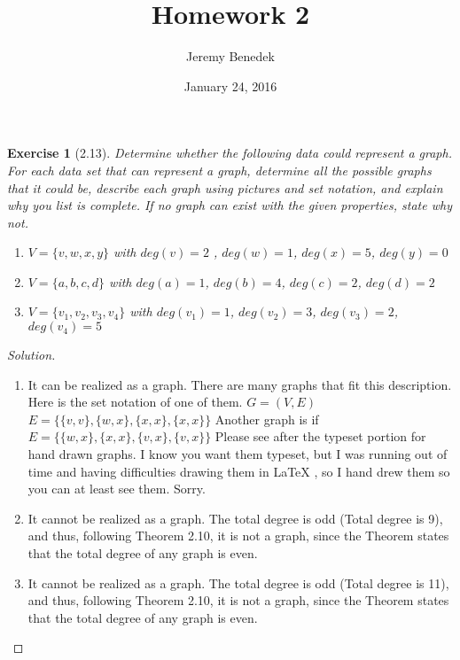 \documentclass{article}
\title{Homework 2}
\author{Jeremy Benedek}
\date{January 24, 2016}
\newtheorem*{ex}{Exercise}
\newenvironment{solution}
  {\begin{proof}[Solution]}
  {\renewcommand{\qedsymbol}{}\end{proof}}
\begin{document}
\maketitle

\begin{ex}[2.13]
	Determine whether the following data could represent a graph. For each data set that \textit{can} represent a graph, determine \textit{all} the possible graphs that it could be, describe each graph using pictures
	and set notation, and explain why you list is complete. If no graph can exist with the given properties, state why not. 
	\begin{enumerate} 
	  \item $V = \{v,w,x,y\}$ with $deg(v) = 2$ , $deg(w) = 1$, $deg(x) = 5$, $deg(y) = 0$
	  \item $V = \{a,b,c,d\}$ with $deg(a) = 1$, $deg(b) = 4$, $deg(c) = 2$, $deg(d) = 2$
          \item $V = \{v_1,v_2,v_3,v_4\}$ with $deg(v_1) = 1$, $deg(v_2) = 3$, $deg(v_3) = 2$, $deg(v_4) = 5$
       \end{enumerate}
\end{ex}
\begin{solution}
	\begin{enumerate}
	  \item It can be realized as a graph. There are many graphs that fit this description. Here is the set notation of one of them. $G=(V,E)$ $E=\{
	\{v,v\}, \{w,x\}, \{x,x\}, \{x,x\}\}$ Another graph is if $E=\{ \{w,x\}, \{x,x\}, \{v,x\}, \{v,x\}\}$ Please see after the typeset portion for
	hand drawn graphs. I know you want them typeset, but I was running out of time and having difficulties drawing them in LaTeX , so I hand drew 
	them so you can at least see them. Sorry. 
	  \item It cannot be realized as a graph. The total degree is odd (Total degree is 9), and thus, following Theorem 2.10, it is not a graph, since the Theorem states that the total degree of any graph is even. 
	  \item It cannot be realized as a graph. The total degree is odd (Total degree is 11), and thus, following Theorem 2.10, it is not a graph, since the Theorem states that the total degree of any graph is even.
	\end{enumerate}
\end{solution}
\end{document}
